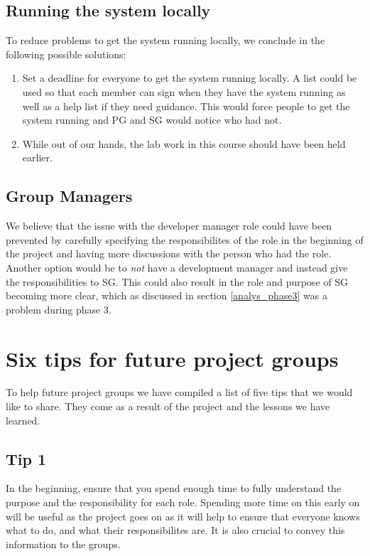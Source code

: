 \documentclass{article}
\begin{document}
    \subsection{Running the system locally \label{analyse_system}}
        To reduce problems to get the system running locally, 
        we conclude in the following possible solutions:
        \begin{enumerate}
            \item Set a deadline for everyone to get the system running locally. 
                    A list could be used so that each member can sign when they have
                    the system running as well as a help list if they need guidance.
                    This would force people to get the system running and PG and SG
                    would notice who had not.
            \item While out of our hands, the lab work in this course should have been held earlier.
        \end{enumerate}
        
    \subsection{Group Managers}
        We believe that the issue with the developer manager role could have been prevented by carefully specifying the responsibilites of the
        role in the beginning of the project and having more discussions with the person who had the role.
        Another option would be to \emph{not} have a development manager
        and instead give the responsibilities to SG. This could also result in the role and purpose of 
        SG becoming more clear, which as discussed in section \ref{analys_phase3} was a problem during phase 3.

\section{Six tips for future project groups \label{tips}}

    To help future project groups we have compiled a list of five tips that we would like to share.
    They come as a result of the project and the lessons we have learned.
    
    \subsection{Tip 1}
        In the beginning, ensure that you spend enough time to fully understand the purpose and the
        responsibility for each role. Spending more time on this early on will be useful as the project
        goes on as it will help to ensure that everyone knows what to do, and what their responsibilites are. It is also crucial
        to convey this information to the groups.
        
\end{document}
